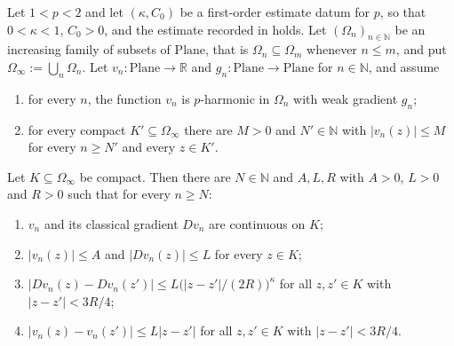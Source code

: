 \begin{lemma}
Let $1<p<2$ and let $(\kappa,C_0)$ be a first-order estimate datum for $p$, so that
$0<\kappa<1$, $C_0>0$, and the estimate recorded in  holds.
Let $(\Omega_n)_{n\in\mathbb{N}}$ be an increasing family of subsets of $\mathrm{Plane}$, that is
$\Omega_n\subseteq\Omega_m$ whenever $n\le m$, and put $\Omega_\infty:=\bigcup_n\Omega_n$.  Let
$v_n\colon\mathrm{Plane}\to\mathbb{R}$ and $g_n\colon\mathrm{Plane}\to\mathrm{Plane}$ for
$n\in\mathbb{N}$, and assume
\begin{enumerate}
\item for every $n$, the function $v_n$ is $p$-harmonic in $\Omega_n$ with weak gradient $g_n$;
\item for every compact $K'\subseteq\Omega_\infty$ there are $M>0$ and $N'\in\mathbb{N}$ with
$\lvert v_n(z)\rvert\le M$ for every $n\ge N'$ and every $z\in K'$.
\end{enumerate}
Let $K\subseteq\Omega_\infty$ be compact.  Then there are $N\in\mathbb{N}$ and $A,L,R$ with
$A>0$, $L>0$ and $R>0$ such that for every $n\ge N$:
\begin{enumerate}
\item[(i)] $v_n$ and its classical gradient $Dv_n$ are continuous on $K$;
\item[(ii)] $\lvert v_n(z)\rvert\le A$ and $\lvert Dv_n(z)\rvert\le L$ for every $z\in K$;
\item[(iii)] $\lvert Dv_n(z)-Dv_n(z')\rvert\le L\bigl(\lvert z-z'\rvert/(2R)\bigr)^{\kappa}$ for
all $z,z'\in K$ with $\lvert z-z'\rvert<3R/4$;
\item[(iv)] $\lvert v_n(z)-v_n(z')\rvert\le L\lvert z-z'\rvert$ for all $z,z'\in K$ with
$\lvert z-z'\rvert<3R/4$.
\end{enumerate}
\end{lemma}
